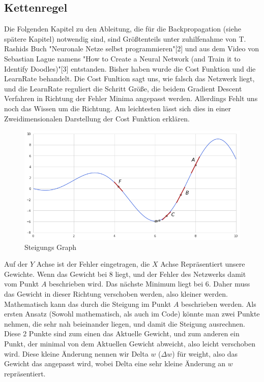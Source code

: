 \documentclass[12pt]{article}
\begin{document}
\subsection{Kettenregel}
Die Folgenden Kapitel zu den Ableitung, die für die Backpropagation (siehe spätere Kapitel) notwendig sind, sind Größtenteils unter zuhilfenahme von T. Rashids Buch "Neuronale Netze selbst programmieren"[2] und aus dem Video von Sebastian Lague namens "How to Create a Neural Network (and Train it to Identify Doodles)"[3] entstanden. 
Bisher haben wurde die Cost Funktion und die LearnRate behandelt. Die Cost Funltion sagt uns, wie falsch das Netzwerk liegt, und die LearnRate reguliert die Schritt Größe, die beidem Gradient Descent Verfahren in Richtung der Fehler Minima angepasst werden. Allerdings Fehlt uns noch das Wissen um die Richtung. 
Am leichtesten lässt sich dies in einer Zweidimensionalen Darstellung der Cost Funktion erklären.
\begin{figure}[H]
\centering
\includegraphics[scale=0.50]{./Images/Pasted image 20230917195146.png}
\caption{Steigungs Graph}
\label{Was kommt hier rein?}
\end{figure}
Auf der $Y$ Achse ist der Fehler eingetragen, die $X$ Achse Repräsentiert unsere Gewichte. Wenn das Gewicht bei 8 liegt, und der Fehler des Netzwerks damit vom Punkt $A$ beschrieben wird. Das nächste Minimum liegt bei 6. Daher muss das Gewicht in dieser Richtung verschoben werden, also kleiner werden. 
Mathematisch kann das durch die Steigung im Punkt $A$ beschrieben werden. Als ersten Ansatz (Sowohl mathematisch, als auch im Code) könnte man zwei Punkte nehmen, die sehr nah beieinander liegen, und damit die Steigung ausrechnen. Diese 2 Punkte sind zum einen das Aktuelle Gewicht, und zum anderen ein Punkt, der minimal von dem Aktuellen Gewicht abweicht, also leicht verschoben wird.
Diese kleine Änderung nennen wir Delta $w$ ($\Delta w$) für weight, also das Gewicht das angepasst wird, wobei Delta eine sehr kleine Änderung an $w$ repräsentiert.
\end{document}
